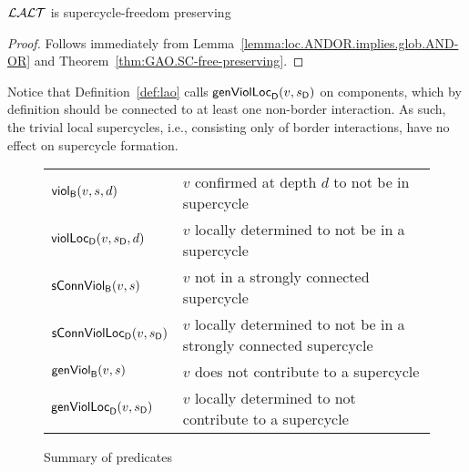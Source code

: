 \begin{theorem} \label{thm:LAO.SC-free-preserving}
$\LAO$ is supercycle-freedom preserving
\end{theorem}
%
\begin{proof}
Follows immediately from Lemma~\ref{lemma:loc.ANDOR.implies.glob.AND-OR} and Theorem~\ref{thm:GAO.SC-free-preserving}.
\end{proof}


Notice that Definition~\ref{def:lao} calls $\locFormViol{v}{\sD}{\act}{\l}$ on components, which by definition should be connected to at least one non-border interaction. 
As such, the trivial local supercycles, i.e., consisting only of border interactions, have no effect on supercycle formation. 

\begin{figure}[t]

\begin{tabular}{|l|l|}
\hline
$\scViol{v}{d}{s}$  & $v$ confirmed at depth $d$ to not be in supercycle\\ 
$\locScViol{v}{d}{\sD}{\act}{\l}$ & $v$ locally determined to not be in a supercycle\\

$\connViol{v}{s}$ & $v$ not in a strongly connected supercycle \\

$\locConnViol{v}{\sD}{\act}{\l}$ & $v$ locally determined to not be in a strongly connected supercycle \\

$\formViol{v}{s}$ & $v$ does not contribute to a supercycle\\

$\locFormViol{v}{\sD}{\act}{\l}$ & $v$ locally determined to not contribute to a supercycle\\

\hline
\end{tabular}

\caption{Summary of predicates}
\label{fig:summaryPredicates}
\end{figure}











